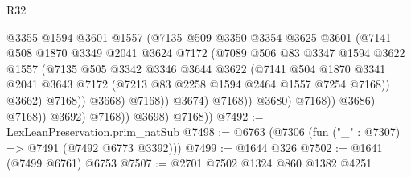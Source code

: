 \begin{lexlean}{R32}
\begin{coremodule}
                                      @3355
                                      @1594
                                      @3601
                                      @1557
                                      (@7135
                                        @509
                                        @3350
                                        @3354
                                        @3625
                                        @3601
                                        (@7141
                                          @508
                                          @1870
                                          @3349
                                          @2041
                                          @3624
                                          @7172
                                          (@7089
                                            @506
                                            @83
                                            @3347
                                            @1594
                                            @3622
                                            @1557
                                            (@7135
                                              @505
                                              @3342
                                              @3346
                                              @3644
                                              @3622
                                              (@7141
                                                @504
                                                @1870
                                                @3341
                                                @2041
                                                @3643
                                                @7172
                                                (@7213 @83 @2258 @1594 @2464 @1557 @7254 @7168))
                                              @3662)
                                            @7168))
                                        @3668)
                                      @7168))
                                  @3674)
                                @7168))
                            @3680)
                          @7168))
                      @3686)
                    @7168))
                @3692)
              @7168))
          @3698)
        @7168))
@7492 := LexLeanPreservation.prim_natSub
@7498 := @6763 (@7306 (fun ("_" : @7307) => @7491 (@7492 @6773 @3392)))
@7499 := @1644 @326
@7502 := @1641 (@7499 @6761) @6753
@7507 := @2701 @7502 @1324 @860 @1382 @4251

\end{coremodule}
\end{lexlean}
